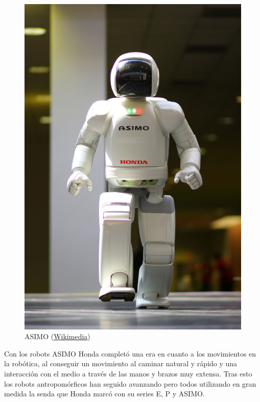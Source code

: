 \begin{figure}[!h]
	\centering
	\includegraphics[scale=0.2]{./EtapaModerna/Imagenes/asimo.jpg}
	\caption{ASIMO (\href{https://es.m.wikipedia.org/wiki/Archivo:ASIMO_4.28.11.jpg}{Wikimedia})}
	\label{fig:asimo}
\end{figure}

Con los robots ASIMO Honda completó una era en cuanto a los movimientos en la robótica, al conseguir un movimiento al caminar natural y rápido y una interacción con el medio a través de las manos y brazos muy extensa. Tras esto los robots antropomórficos han seguido avanzando pero todos utilizando en gran medida la senda que Honda marcó con su series E, P y ASIMO.
